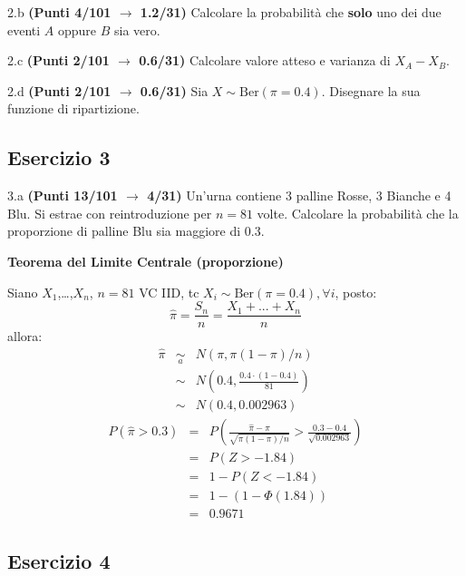 \documentclass[
  11pt,
]{book}
\theoremstyle{mytheoremstyle}
\theoremstyle{mydefstyle}
\newenvironment{sol}
  {
  \begin{tcolorbox}[enhanced,breakable,arc=0.1mm,boxrule=1pt,colback=white,colframe=iblue,
  title=\bf \fontfamily{lmss}\selectfont \hspace{.5 cm} Soluzione,drop fuzzy shadow]

}{
\end{tcolorbox}
  }
\begin{document}
2.b \textbf{(Punti 4/101 \(\rightarrow\) 1.2/31)} Calcolare la probabilità che \textbf{solo} uno dei due eventi \(A\) oppure \(B\) sia vero.

2.c \textbf{(Punti 2/101 \(\rightarrow\) 0.6/31)} Calcolare valore atteso e varianza di \(X_A-X_B\).

2.d \textbf{(Punti 2/101 \(\rightarrow\) 0.6/31)} Sia \(X\sim\text{Ber}(\pi=0.4)\). Disegnare la sua funzione di ripartizione.

\subsection{Esercizio 3}\label{esercizio-3-24}

3.a \textbf{(Punti 13/101 \(\rightarrow\) 4/31)} Un'urna contiene 3 palline Rosse, 3 Bianche e 4 Blu. Si estrae con reintroduzione per \(n=81\) volte.
Calcolare la probabilità che la proporzione di palline Blu sia maggiore di 0.3.

\begin{sol}
\textbf{Teorema del Limite Centrale (proporzione)}

Siano \(X_1\),\ldots,\(X_n\), \(n=81\) VC IID, tc \(X_i\sim\text{Ber}(\pi=0.4)\)\(,\forall i\), posto:
\[
      \hat\pi=\frac{S_n}n = \frac{X_1 + ... + X_n}n
      \]
allora:\begin{eqnarray*}
  \hat\pi & \mathop{\sim}\limits_{a}& N(\pi,\pi(1-\pi)/n) \\
  &\sim & N\left(0.4,\frac{0.4\cdot(1-0.4)}{81}\right) \\
     &\sim & N(0.4,0.002963) 
  \end{eqnarray*}\begin{eqnarray*}
      P( \hat\pi   >   0.3 ) 
        &=& P\left(  \frac { \hat\pi  -  \pi }{ \sqrt{\pi(1-\pi)/n} }  >  \frac { 0.3  -  0.4 }{\sqrt{ 0.002963 }} \right)  \\
                 &=& P\left(  Z   >   -1.84 \right) \\    &=& 1-P(Z< -1.84 )\\ 
                 &=&  1-(1-\Phi( 1.84 )) \\ &=&  0.9671 
      \end{eqnarray*}

\end{sol}

\subsection{Esercizio 4}\label{esercizio-4-24}
\end{document}
